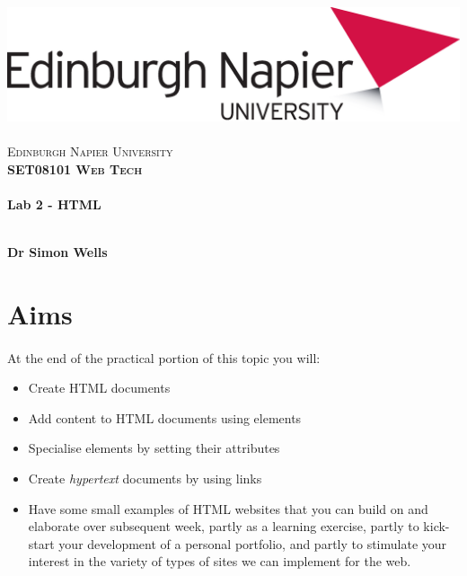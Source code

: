 \documentclass[10pt, a4paper, twosize]{article}
\begin{document}

\begin{titlepage}
\vspace*{5cm}
\begin{center}
\includegraphics[width=.5\textwidth]{images/EdNapUniLogoCMYK}~\\[1cm]

\textsc{\Large Edinburgh Napier University}\\[1.5cm]

\textsc{\LARGE \bfseries SET08101 Web Tech}\\[0.5cm]

\hrulefill \\[0.4cm]
{\huge \bfseries Lab 2 - HTML \\[0.4cm] }
\hrulefill \\[1.5cm]

\begin{minipage}{0.4\textwidth}
\begin{flushleft} \large
\textbf{Dr Simon Wells} \\
\end{flushleft}
\end{minipage}

\vfill

\end{center}
\end{titlepage}




%

\section{Aims}
\paragraph{} At the end of the practical portion of this topic you will:

\begin{itemize}
\item Create HTML documents
\item Add content to HTML documents using elements
\item Specialise elements by setting their attributes
\item Create \emph{hypertext} documents by using links
\item Have some small examples of HTML websites that you can build on and elaborate over subsequent week, partly as a learning exercise, partly to kick-start your development of a personal portfolio, and partly to stimulate your interest in the variety of types of sites we can implement for the web.
\end{itemize}
\end{document}
